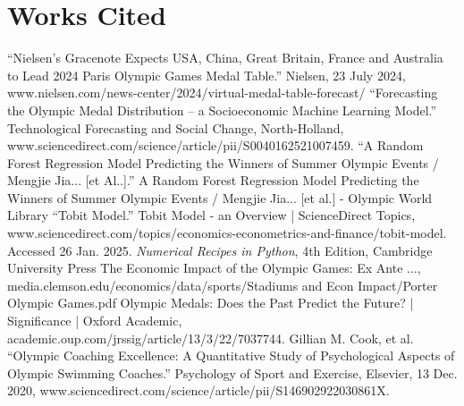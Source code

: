 \documentclass{mcmthesis}
\begin{document}
\section{Works Cited}
\begin{thebibliography}{99}
 “Nielsen’s Gracenote Expects USA, China, Great Britain, France and Australia to Lead 2024 Paris Olympic Games Medal Table.” Nielsen, 23 July 2024, www.nielsen.com/news-center/2024/virtual-medal-table-forecast/ 
 “Forecasting the Olympic Medal Distribution – a Socioeconomic Machine Learning Model.” Technological Forecasting and Social Change, North-Holland, www.sciencedirect.com/science/article/pii/S0040162521007459.
 “A Random Forest Regression Model Predicting the Winners of Summer Olympic Events / Mengjie Jia... [et Al..].” A Random Forest Regression Model Predicting the Winners of Summer Olympic Events / Mengjie Jia... [et al.] - Olympic World Library
 “Tobit Model.” Tobit Model - an Overview | ScienceDirect Topics, www.sciencedirect.com/topics/economics-econometrics-and-finance/tobit-model. Accessed 26 Jan. 2025. 
 \textit{Numerical Recipes in Python}, 4th Edition, Cambridge University Press
 The Economic Impact of the Olympic Games: Ex Ante ..., media.clemson.edu/economics/data/sports/Stadiums and Econ Impact/Porter Olympic Games.pdf  
 Olympic Medals: Does the Past Predict the Future? | Significance | Oxford Academic, academic.oup.com/jrssig/article/13/3/22/7037744. 
 Gillian M. Cook, et al. “Olympic Coaching Excellence: A Quantitative Study of Psychological Aspects of Olympic Swimming Coaches.” Psychology of Sport and Exercise, Elsevier, 13 Dec. 2020, www.sciencedirect.com/science/article/pii/S146902922030861X.
\end{thebibliography}
\end{document}
